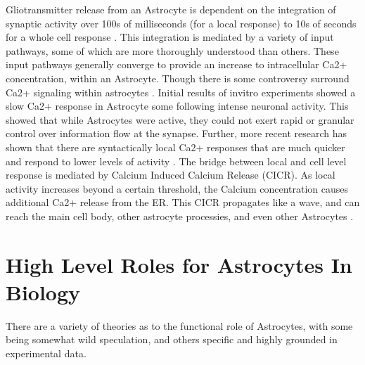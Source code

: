    Gliotransmitter release from an Astrocyte is dependent on the integration of
    synaptic activity over 100s of milliseconds (for a local response)
    \cite{pitta_2016} to 10s of seconds for a whole cell response
    \cite{mederos_2018}. This integration is mediated by a variety of input
    pathways, some of which are more thoroughly understood than others. These
    input pathways generally converge to provide an increase to intracellular
    Ca2+ concentration, within an Astrocyte. Though there is some controversy
    surround Ca2+ signaling within astrocytes \cite{mederos_2018}. Initial
    results of invitro experiments showed a slow Ca2+ response in Astrocyte some
    following intense neuronal activity. This showed that while Astrocytes were
    active, they could not exert rapid or granular control over information flow
    at the synapse. Further, more recent research has shown that there are
    syntactically local Ca2+ responses that are much quicker and respond to
    lower levels of activity \cite{araque_2014}. The bridge between local and
    cell level response is mediated by Calcium Induced Calcium Release
    (CICR). As local activity increases beyond a certain threshold, the Calcium
    concentration causes additional Ca2+ release from the ER. This CICR
    propagates like a wave, and can reach the main cell body, other astrocyte
    processies, and even other Astrocytes \cite{manninen_2018}.


    \section{High Level Roles for Astrocytes In Biology}
    
    There are a variety of theories as to the functional role of Astrocytes,
    with some being somewhat wild speculation, and others specific and highly
    grounded in experimental data.

